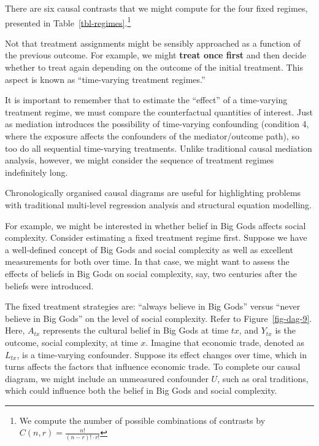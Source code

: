 \documentclass[
  singlecolumn]{article}
\begin{document}
There are six causal contrasts that we might compute for the four fixed
regimes, presented in Table~\ref{tbl-regimes}.\footnote{We compute the
  number of possible combinations of contrasts by
  \(C(n, r) = \frac{n!}{(n-r)! \cdot r!}\)}

Not that treatment assignments might be sensibly approached as a
function of the previous outcome. For example, we might \textbf{treat
once first} and then decide whether to treat again depending on the
outcome of the initial treatment. This aspect is known as ``time-varying
treatment regimes.''

It is important to remember that to estimate the ``effect'' of a
time-varying treatment regime, we must compare the counterfactual
quantities of interest. Just as mediation introduces the possibility of
time-varying confounding (condition 4, where the exposure affects the
confounders of the mediator/outcome path), so too do all sequential
time-varying treatments. Unlike traditional causal mediation analysis,
however, we might consider the sequence of treatment regimes
indefinitely long.

Chronologically organised causal diagrams are useful for highlighting
problems with traditional multi-level regression analysis and structural
equation modelling.

For example, we might be interested in whether belief in Big Gods
affects social complexity. Consider estimating a fixed treatment regime
first. Suppose we have a well-defined concept of Big Gods and social
complexity as well as excellent measurements for both over time. In that
case, we might want to assess the effects of beliefs in Big Gods on
social complexity, say, two centuries after the beliefs were introduced.

The fixed treatment strategies are: ``always believe in Big Gods''
versus ``never believe in Big Gods'' on the level of social complexity.
Refer to Figure~\ref{fig-dag-9}. Here, \(A_{tx}\) represents the
cultural belief in Big Gods at time \(tx\), and \(Y_{tx}\) is the
outcome, social complexity, at time \(x\). Imagine that economic trade,
denoted as \(L_{tx}\), is a time-varying confounder. Suppose its effect
changes over time, which in turns affects the factors that influence
economic trade. To complete our causal diagram, we might include an
unmeasured confounder \(U\), such as oral traditions, which could
influence both the belief in Big Gods and social complexity.
\end{document}
